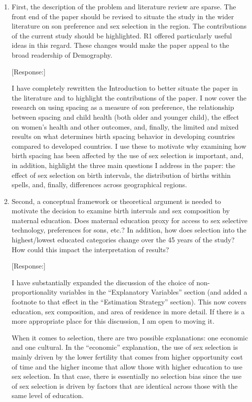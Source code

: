\documentclass[letterpaper,12pt]{article}
\begin{document}
\begin{enumerate}

\item First, the description of the problem and literature review are sparse.
The front end of the paper should be revised to situate the study in the
wider literature on son preference and sex selection in the region. The
contributions of the current study should be highlighted. R1 offered
particularly useful ideas in this regard. These changes would make the
paper appeal to the broad readership of Demography.

[Response:]

I have completely rewritten the Introduction to better situate the paper in the literature
and to highlight the contributions of the paper.
I now cover the research on using spacing as a measure of son preference, the 
relationship between spacing and child health (both older and younger child), the 
effect on women's health and other outcomes, and, finally, the limited and mixed results
on what determines birth spacing behavior in developing countries compared to developed 
countries.
I use these to motivate why examining how birth spacing has been affected by the use of
sex selection is important, and, in addition, highlight the three main questions I address 
in the paper: the effect of sex selection on birth intervals, the distribution of births 
within spells, and, finally, differences across geographical regions.


\item Second, a conceptual framework or theoretical argument is needed to
motivate the decision to examine birth intervals and sex composition by
maternal education. Does maternal education proxy for access to sex
selective technology, preferences for sons, etc.? 
In addition, how does
selection into the highest/lowest educated categories change over the 45
years of the study? How could this impact the interpretation of results?

[Response:]

I have substantially expanded the discussion of the choice of non-proportionality 
variables in the ``Explanatory Variables'' section (and added a footnote to that effect 
in the ``Estimation Strategy'' section).
This now covers education, sex composition, and area of residence in more detail.
If there is a more appropriate place for this discussion, I am open to moving it.

When it comes to selection, there are two possible explanations: one economic and one 
cultural.
In the ``economic'' explanation, the use of sex selection is mainly driven by the lower 
fertility that comes from higher opportunity cost of time and the higher income that allow 
those with higher education to use sex selection.
In that case, there is essentially no selection bias since the use of sex selection is 
driven by factors that are identical across those with the same level of education.


\end{enumerate}
\end{document}
